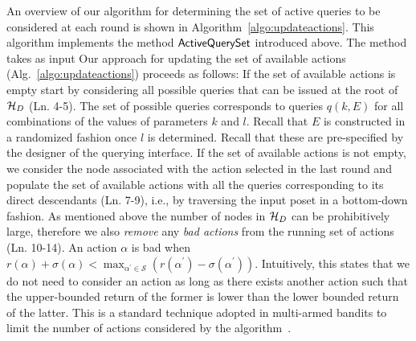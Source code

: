 An overview of our algorithm for determining the set of active queries to be considered at each round is shown in Algorithm~\ref{algo:updateactions}. This algorithm implements the method ${\sf ActiveQuerySet}$ introduced above. The method takes as input
Our approach for updating the set of available actions (Alg.~\ref{algo:updateactions}) proceeds as follows: If the set of available actions is empty start by considering all possible queries that can be issued at the root of $\mathcal{H}_D$ (Ln. 4-5). The set of possible queries corresponds to queries $q(k,E)$ for all combinations of the values of parameters $k$ and $l$. Recall that $E$ is constructed in a randomized fashion once $l$ is determined. Recall that these are pre-specified by the designer of the querying interface. If the set of available actions is not empty, we consider the node associated with the action selected in the last round and populate the set of available actions with all the queries corresponding to its direct descendants (Ln. 7-9), i.e., by traversing the input poset in a bottom-down fashion. As mentioned above the number of nodes in $\mathcal{H}_D$ can be prohibitively large, therefore we also {\em remove} any {\em bad actions} from the running set of actions (Ln.  10-14). 
An action $\alpha$ is bad when $r(\alpha) + \sigma(\alpha) < \max_{\alpha^{\prime} \in \mathcal{S}} (r(\alpha^{\prime}) - \sigma(\alpha^{\prime}))$. Intuitively, this states that we do not need to consider an action as long as there exists another action such that the upper-bounded return of the former is lower than the lower bounded return of the latter. This is a standard technique adopted in multi-armed bandits to limit the number of actions considered by the algorithm~\cite{EvenDar06actionelimination}. 


